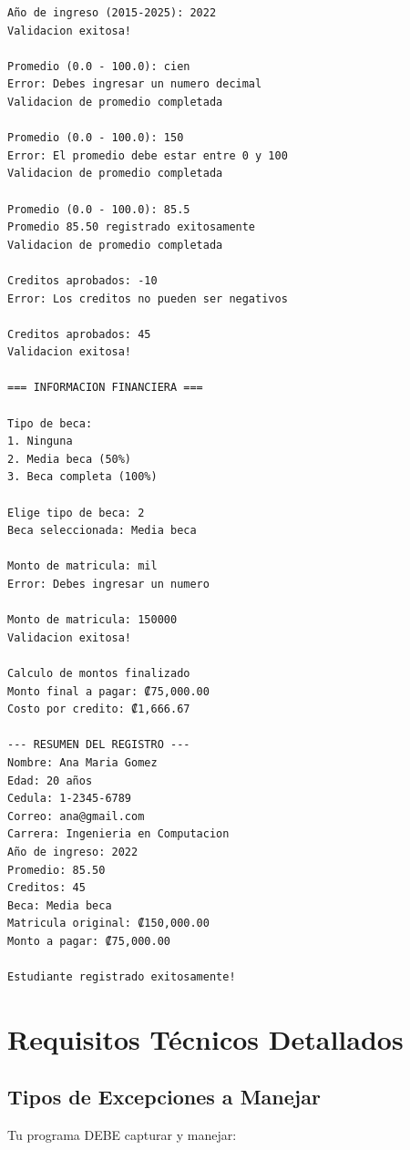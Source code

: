 \documentclass[12pt,a4paper]{article}
\begin{document}
\begin{lstlisting}[caption=Flujo completo con manejo de errores]
Año de ingreso (2015-2025): 2022
Validacion exitosa!

Promedio (0.0 - 100.0): cien
Error: Debes ingresar un numero decimal
Validacion de promedio completada

Promedio (0.0 - 100.0): 150
Error: El promedio debe estar entre 0 y 100
Validacion de promedio completada

Promedio (0.0 - 100.0): 85.5
Promedio 85.50 registrado exitosamente
Validacion de promedio completada

Creditos aprobados: -10
Error: Los creditos no pueden ser negativos

Creditos aprobados: 45
Validacion exitosa!

=== INFORMACION FINANCIERA ===

Tipo de beca:
1. Ninguna
2. Media beca (50%)
3. Beca completa (100%)

Elige tipo de beca: 2
Beca seleccionada: Media beca

Monto de matricula: mil
Error: Debes ingresar un numero

Monto de matricula: 150000
Validacion exitosa!

Calculo de montos finalizado
Monto final a pagar: ₡75,000.00
Costo por credito: ₡1,666.67

--- RESUMEN DEL REGISTRO ---
Nombre: Ana Maria Gomez
Edad: 20 años
Cedula: 1-2345-6789
Correo: ana@gmail.com
Carrera: Ingenieria en Computacion
Año de ingreso: 2022
Promedio: 85.50
Creditos: 45
Beca: Media beca
Matricula original: ₡150,000.00
Monto a pagar: ₡75,000.00

Estudiante registrado exitosamente!
\end{lstlisting}

\newpage

\section{Requisitos Técnicos Detallados}

\subsection{Tipos de Excepciones a Manejar}

Tu programa DEBE capturar y manejar:
\end{document}
